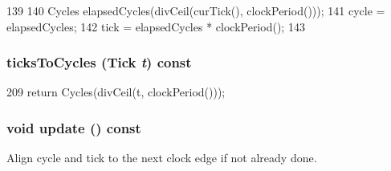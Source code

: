 \begin{DoxyCode}
139     {
140         Cycles elapsedCycles(divCeil(curTick(), clockPeriod()));
141         cycle = elapsedCycles;
142         tick = elapsedCycles * clockPeriod();
143     }
\end{DoxyCode}
\hypertarget{classClockedObject_a91cfeb85669839d1ecafb7e62cf9d57a}{
\subsubsection[{ticksToCycles}]{ ticksToCycles ({\bf Tick} {\em t}) const}}
\label{classClockedObject_a91cfeb85669839d1ecafb7e62cf9d57a}



\begin{DoxyCode}
209     { return Cycles(divCeil(t, clockPeriod())); }
\end{DoxyCode}
\hypertarget{classClockedObject_ac277f12bf13b157b9686a275f723612f}{
\subsubsection[{update}]{\setlength{\rightskip}{0pt plus 5cm}void update () const}}
\label{classClockedObject_ac277f12bf13b157b9686a275f723612f}
Align cycle and tick to the next clock edge if not already done. 


